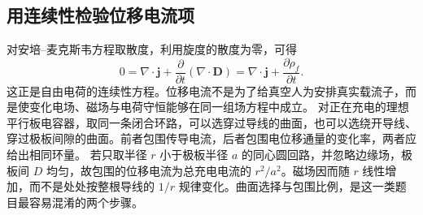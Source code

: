 \subsection{用连续性检验位移电流项}
对安培--麦克斯韦方程取散度，利用旋度的散度为零，可得
\[
 0=\nabla\cdot\boldsymbol j+\frac{\partial}{\partial t}(\nabla\cdot\boldsymbol D)
 =\nabla\cdot\boldsymbol j+\frac{\partial\rho_f}{\partial t}.
\]
这正是自由电荷的连续性方程。位移电流不是为了给真空人为安排真实载流子，而是使变化电场、磁场与电荷守恒能够在同一组场方程中成立。
对正在充电的理想平行板电容器，取同一条闭合环路，可以选穿过导线的曲面，也可以选绕开导线、穿过极板间隙的曲面。前者包围传导电流，后者包围电位移通量的变化率，两者应给出相同环量。
若只取半径 $r$ 小于极板半径 $a$ 的同心圆回路，并忽略边缘场，极板间 $D$ 均匀，故包围的位移电流为总充电电流的 $r^2/a^2$。磁场因而随 $r$ 线性增加，而不是处处按整根导线的 $1/r$ 规律变化。曲面选择与包围比例，是这一类题目最容易混淆的两个步骤。

